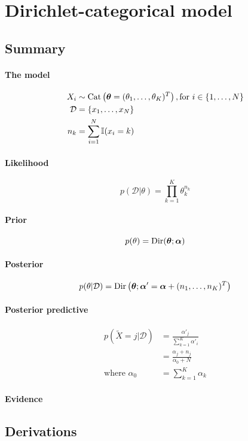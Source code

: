 \section{Dirichlet-categorical model}
\subsection{Summary}
\paragraph{The model}
    \begin{align}
        X_i         &\sim \operatorname{Cat}\left(\boldsymbol{\mathbf{\theta}} = (\theta_1, \dotsc, \theta_K)^T\right), \text{for } i \in \{1, \dotsc, N\} \\
        \mathcal D  &= \{x_1, \dotsc, x_N\} \\
        n_k         &= \sum_{i = 1}^N \mathbb I (x_i = k)
    \end{align}

\paragraph{Likelihood}
    \begin{equation}
        p(\mathcal D | \theta) = \prod_{k = 1}^K \theta_k^{n_k}
    \end{equation}

\paragraph{Prior}
    \begin{equation}
        p(\theta)   = \operatorname{Dir}(\boldsymbol{\mathbf{\theta}}; \boldsymbol{\mathbf{\alpha}})
    \end{equation}

\paragraph{Posterior}
    \begin{equation}
        p(\theta | \mathcal D) = \operatorname{Dir}\left(\boldsymbol{\mathbf{\theta}}; \boldsymbol{\mathbf{\alpha}}' = \boldsymbol{\mathbf{\alpha}} + (n_1, \dotsc, n_K)^T\right)
    \end{equation}

\paragraph{Posterior predictive}
    \begin{align}
        p(\tilde X = j | \mathcal D)   &= \frac{\alpha'_j}{\sum_{k = 1}^K \alpha'_i} \\
                                &= \frac{\alpha_j + n_j}{\alpha_0 + N} \\
        \text{where } \alpha_0  &= \sum_{k = 1}^K \alpha_k
    \end{align}

\paragraph{Evidence}

\subsection{Derivations}
